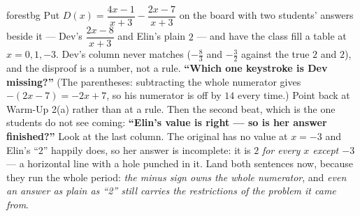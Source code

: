 \documentclass[10pt]{article}
\begin{document}
\begin{skillbox}[Hook]{forestbg}
    Put $D(x)=\dfrac{4x-1}{x+3}-\dfrac{2x-7}{x+3}$ on the board with two students' answers beside it ---
    Dev's $\dfrac{2x-8}{x+3}$ and Elin's plain $2$ --- and have the class fill a table at $x=0,1,-3$.
    Dev's column never matches ($-\tfrac83$ and $-\tfrac32$ against the true $2$ and $2$), and the
    disproof is a number, not a rule. \textbf{``Which one keystroke is Dev missing?''} (The parentheses:
    subtracting the whole numerator gives $-(2x-7)=-2x+7$, so his numerator is off by $14$ every time.)
    Point back at Warm-Up 2(a) rather than at a rule. Then the second beat, which is the one students do
    not see coming: \textbf{``Elin's value is right --- so is her answer finished?''} Look at the last
    column. The original has no value at $x=-3$ and Elin's ``$2$'' happily does, so her answer is
    incomplete: it is $2$ \emph{for every $x$ except $-3$} --- a horizontal line with a hole punched in
    it. Land both sentences now, because they run the whole period: \emph{the minus sign owns the whole
    numerator}, and \emph{even an answer as plain as ``2'' still carries the restrictions of the problem
    it came from}.
\end{skillbox}
\end{document}
